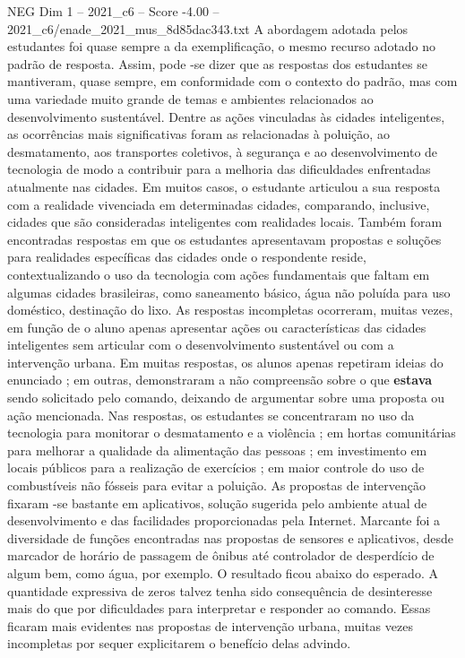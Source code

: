 \begin{textsample}{NEG Dim 1 – 2021\_c6 – Score -4.00 – 2021\_c6/enade\_2021\_mus\_8d85dac343.txt}
A abordagem adotada pelos estudantes foi quase sempre a da exemplificação, o mesmo recurso adotado no padrão de resposta.
Assim, pode -se dizer que as respostas dos estudantes se mantiveram, quase sempre, em conformidade com o contexto do padrão, mas com uma variedade muito grande de temas e ambientes relacionados ao desenvolvimento sustentável.
Dentre as ações vinculadas às cidades inteligentes, as ocorrências mais significativas foram as relacionadas à poluição, ao desmatamento, aos transportes coletivos, à segurança e ao desenvolvimento de tecnologia de modo a contribuir para a melhoria das dificuldades enfrentadas atualmente nas cidades.
Em muitos casos, o estudante articulou a sua resposta com a realidade vivenciada em determinadas cidades, comparando, inclusive, cidades que são consideradas inteligentes com realidades locais.
Também foram encontradas respostas em que os estudantes apresentavam propostas e soluções para realidades específicas das cidades onde o respondente reside, contextualizando o uso da tecnologia com ações fundamentais que faltam em algumas cidades brasileiras, como saneamento básico, água não poluída para uso doméstico, destinação do lixo.
As respostas incompletas ocorreram, muitas vezes, em função de o aluno apenas apresentar ações ou características das cidades inteligentes sem articular com o desenvolvimento sustentável ou com a intervenção urbana.
Em muitas respostas, os alunos apenas repetiram ideias do enunciado ; em outras, demonstraram a não compreensão sobre o que \textbf{estava} sendo solicitado pelo comando, deixando de argumentar sobre uma proposta ou ação mencionada.
Nas respostas, os estudantes se concentraram no uso da tecnologia para monitorar o desmatamento e a violência ; em hortas comunitárias para melhorar a qualidade da alimentação das pessoas ; em investimento em locais públicos para a realização de exercícios ; em maior controle do uso de combustíveis não fósseis para evitar a poluição.
As propostas de intervenção fixaram -se bastante em aplicativos, solução sugerida pelo ambiente atual de desenvolvimento e das facilidades proporcionadas pela Internet.
Marcante foi a diversidade de funções encontradas nas propostas de sensores e aplicativos, desde marcador de horário de passagem de ônibus até controlador de desperdício de algum bem, como água, por exemplo.
O resultado ficou abaixo do esperado.
A quantidade expressiva de zeros talvez tenha sido consequência de desinteresse mais do que por dificuldades para interpretar e responder ao comando.
Essas ficaram mais evidentes nas propostas de intervenção urbana, muitas vezes incompletas por sequer explicitarem o benefício delas advindo.

\end{textsample}

